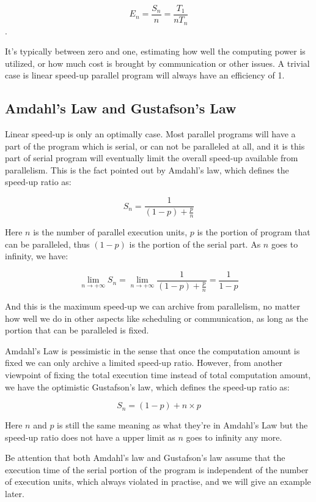 \documentclass[12pt,a4paper]{report}
\begin{document}
$$ E_n = \frac{S_n}{n} = \frac{T_1}{nT_n} $$.

It's typically between zero and one, estimating how well the computing power is utilized, or how much cost is brought by communication or other issues. A trivial case is linear speed-up parallel program will always have an efficiency of 1.

\subsection{Amdahl's Law and Gustafson's Law}

Linear speed-up is only an optimally case. Most parallel programs will have a part of the program which is serial, or can not be paralleled at all, and it is this part of serial program will eventually limit the overall speed-up available from parallelism. This is the fact pointed out by Amdahl's law, which defines the speed-up ratio as:

$$ S_n = \frac{1}{(1 - p) + \frac{p}{n}} $$

Here $n$ is the number of parallel execution units, $p$ is the portion of program that can be paralleled, thus $(1-p)$ is the portion of the serial part. As $n$ goes to infinity, we have:

$$ \lim_{n \to +\infty} S_n = \lim_{n \to +\infty} \frac{1}{(1 - p) + \frac{p}{n}} = \frac{1}{1 - p} $$

And this is the maximum speed-up we can archive from parallelism, no matter how well we do in other aspects like scheduling or communication, as long as the portion that can be paralleled is fixed.

Amdahl's Law is pessimistic in the sense that once the computation amount is fixed we can only archive a limited speed-up ratio. However, from another viewpoint of fixing the total execution time instead of total computation amount, we have the optimistic Gustafson's law, which defines the speed-up ratio as:

$$ S_n = (1 - p) + n \times p $$

Here $n$ and $p$ is still the same meaning as what they're in Amdahl's Law but the speed-up ratio does not have a upper limit as $n$ goes to infinity any more.

Be attention that both Amdahl's law and Gustafson's law assume that the execution time of the serial portion of the program is independent of the number of execution units, which always violated in practise, and we will give an example later.
\end{document}
